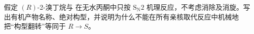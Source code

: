 假定 $(R)$-2-溴丁烷与  在无水丙酮中只按 $\mathrm{S_N2}$ 机理反应，不考虑消除及消旋。写出有机产物名称、绝对构型，并说明为什么不能在所有亲核取代反应中机械地把“构型翻转”等同于 $R\to S$。
